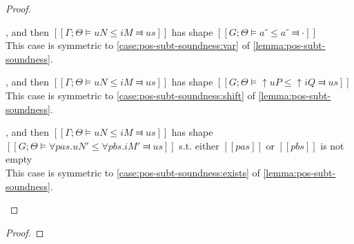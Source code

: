 \begin{proof}
\begin{caseof}
        \item {}, and then $[[Γ ; Θ ⊨ uN ≤ iM ⫤ us]]$ has shape $[[G;Θ ⊨ a⁻ ≤ a⁻ ⫤ ·]]$\\
        This case is symmetric to \cref{case:pos-subt-soundness:var} of \cref{lemma:pos-subt-soundness}.

        \item {}, and then $[[Γ ; Θ ⊨ uN ≤ iM ⫤ us]]$ has shape $[[G;Θ ⊨ ↑uP ≤ ↑iQ ⫤ us]]$\\
        This case is symmetric to \cref{case:pos-subt-soundness:shift} of \cref{lemma:pos-subt-soundness}.

        \item {}, and then $[[Γ ; Θ ⊨ uN ≤ iM ⫤ us]]$ has shape $[[G;Θ ⊨ ∀pas.uN' ≤ ∀pbs.iM' ⫤ us]]$ s.t. either $[[pas]]$ or $[[pbs]]$ is not empty\\
        This case is symmetric to \cref{case:pos-subt-soundness:exists} of \cref{lemma:pos-subt-soundness}.

\end{caseof}
\end{proof}

\begin{theorem} \hfill
\end{theorem}
\begin{proof}
\end{proof}


